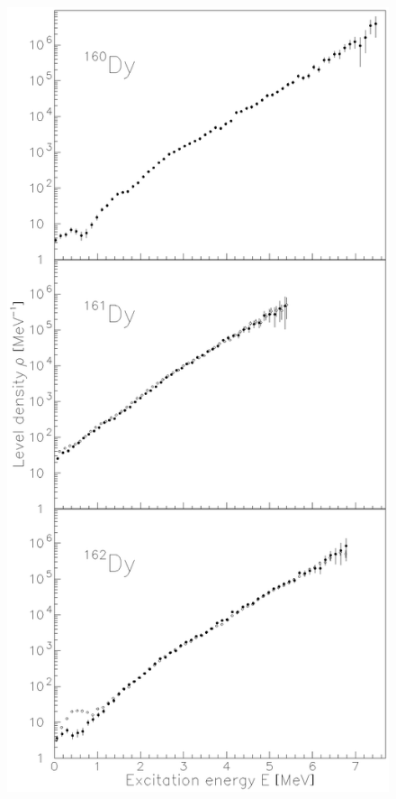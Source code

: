 \documentclass[sort&compress,final,numberedheadings]{aipproc}
\begin{document}
\begin{figure}
\includegraphics[totalheight=10cm,angle=0,bb=107 31 481 783,clip]{fig1a.ps}
\hspace*{2cm}

\end{figure}
\end{document}
